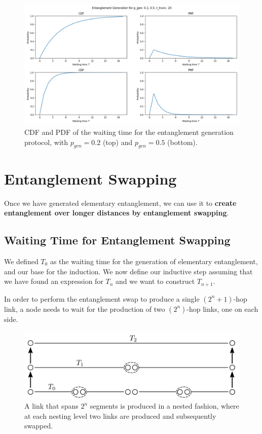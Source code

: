 \documentclass{masterthesis}
\begin{document}
\begin{figure}[ht]
    \centering
    \includegraphics[width=1\linewidth]{images/gen_example_20.png}
    \caption{CDF and PDF of the waiting time for the entanglement generation protocol, with $p_{gen} = 0.2$ (top) and $p_{gen} = 0.5$ (bottom).}
\end{figure}

\newpage
\section*{Entanglement Swapping}

Once we have generated elementary entanglement, we can use it to \textbf{create entanglement over longer distances by entanglement swapping}.

\subsection*{Waiting Time for Entanglement Swapping}

We defined $T_0$ as the waiting time for the generation of elementary entanglement, and our base for the induction.
We now define our inductive step assuming that we have found an expression for $T_n$ and we want to construct $T_{n+1}$. 

In order to perform the entanglement swap to produce a single $(2^n+1)$-hop link, a node needs to wait for the production of two $(2^n)$-hop links, one on each side. 

\begin{figure}[ht]
    \centering
    \includegraphics[width=0.8\linewidth]{images/dist.png}
    \caption{A link that spans $2^n$ segments is produced in a nested fashion, where at each nesting level two links are produced and subsequently swapped. \cite{}} %
    \label{fig:dist}
\end{figure}
\end{document}

